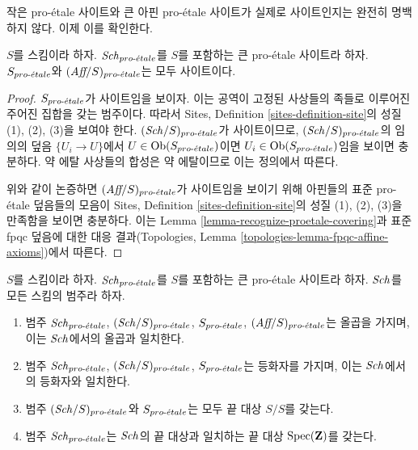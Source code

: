 \noindent
작은 pro-\'etale 사이트와 큰 아핀 pro-\'etale 사이트가 실제로
사이트인지는 완전히 명백하지 않다. 이제 이를 확인한다.

\begin{lemma}
\label{lemma-verify-site-proetale}
$S$를 스킴이라 하자. $\mathit{Sch}_{pro\text{-}\acute{e}tale}$를 $S$를 포함하는 큰
pro-\'etale 사이트라 하자. $S_{pro\text{-}\acute{e}tale}$와
$(\textit{Aff}/S)_{pro\text{-}\acute{e}tale}$는 모두 사이트이다.
\end{lemma}

\begin{proof}
$S_{pro\text{-}\acute{e}tale}$가 사이트임을 보이자. 이는 공역이 고정된 사상들의 족들로
이루어진 주어진 집합을 갖는 범주이다. 따라서 Sites, Definition
\ref{sites-definition-site}의 성질 (1), (2), (3)을 보여야 한다.
$(\mathit{Sch}/S)_{pro\text{-}\acute{e}tale}$가 사이트이므로, $(\mathit{Sch}/S)_{pro\text{-}\acute{e}tale}$의 임의의 덮음
$\{U_i \to U\}$에서 $U \in \mathop{\mathrm{Ob}}\nolimits(S_{pro\text{-}\acute{e}tale})$이면
$U_i \in \mathop{\mathrm{Ob}}\nolimits(S_{pro\text{-}\acute{e}tale})$임을 보이면 충분하다. 약 에탈 사상들의
합성은 약 에탈이므로 이는 정의에서 따른다.

\medskip\noindent
위와 같이 논증하면 $(\textit{Aff}/S)_{pro\text{-}\acute{e}tale}$가 사이트임을 보이기 위해
아핀들의 표준 pro-\'etale 덮음들의 모음이 Sites, Definition
\ref{sites-definition-site}의 성질 (1), (2), (3)을 만족함을 보이면 충분하다.
이는 Lemma \ref{lemma-recognize-proetale-covering}과 표준 fpqc 덮음에 대한
대응 결과(Topologies, Lemma
\ref{topologies-lemma-fpqc-affine-axioms})에서 따른다.
\end{proof}

\begin{lemma}
\label{lemma-fibre-products-proetale}
$S$를 스킴이라 하자. $\mathit{Sch}_{pro\text{-}\acute{e}tale}$를 $S$를 포함하는 큰
pro-\'etale 사이트라 하자. $\mathit{Sch}$를 모든 스킴의 범주라 하자.
\begin{enumerate}
\item 범주 $\mathit{Sch}_{pro\text{-}\acute{e}tale}$, $(\mathit{Sch}/S)_{pro\text{-}\acute{e}tale}$,
$S_{pro\text{-}\acute{e}tale}$, $(\textit{Aff}/S)_{pro\text{-}\acute{e}tale}$는 올곱을 가지며,
이는 $\mathit{Sch}$에서의 올곱과 일치한다.
\item 범주 $\mathit{Sch}_{pro\text{-}\acute{e}tale}$, $(\mathit{Sch}/S)_{pro\text{-}\acute{e}tale}$,
$S_{pro\text{-}\acute{e}tale}$는 등화자를 가지며, 이는 $\mathit{Sch}$에서의 등화자와 일치한다.
\item 범주 $(\mathit{Sch}/S)_{pro\text{-}\acute{e}tale}$와 $S_{pro\text{-}\acute{e}tale}$는 모두 끝 대상
$S/S$를 갖는다.
\item 범주 $\mathit{Sch}_{pro\text{-}\acute{e}tale}$는 $\mathit{Sch}$의 끝 대상과 일치하는 끝 대상
$\mathop{\mathrm{Spec}}(\mathbf{Z})$를 갖는다.
\end{enumerate}
\end{lemma}

